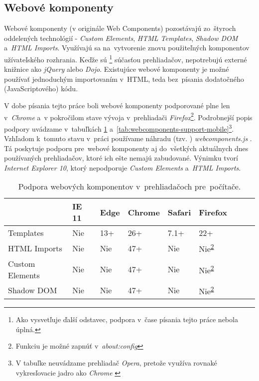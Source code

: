 \subsection{Webové komponenty}

Webové komponenty (v originále Web Components) pozostávajú zo~štyroch oddelených technológií - \emph{Custom Elements}, \emph{HTML Templates}, \emph{Shadow DOM} a~\emph{HTML Imports}. Využívajú sa na~vytvorenie znovu použiteľných komponentov užívateľského rozhrania. Keďže sú \footnote{Ako vysvetľuje ďalší odstavec, podpora v~čase písania tejto práce nebola úplná.} súčasťou prehliadačov, nepotrebujú externé knižnice ako \emph{jQuery} alebo \emph{Dojo}. Existujúce webové komponenty je možné používať jednoduchým importovaním v~HTML, teda bez~písania dodatočného (JavaScriptového) kódu. \cite{MDN_WebComponents}

V dobe písania tejto práce boli webové komponenty podporované plne len v~\emph{Chrome} a~v pokročilom stave vývoja v~prehliadači \emph{Firefox}\footnote{Funkciu je možné zapnúť v~\emph{about:config}\label{aboutconfig}}. Podrobnejší popis podpory uvádzame v~tabuľkách \ref{tab:webcomponents-support-desktop} a~\ref{tab:webcomponents-support-mobile}\footnote{V tabuľke neuvádzame prehliadač \emph{Opera}, pretože využíva rovnaké vykresľovacie jadro ako \emph{Chrome} \cite{Opera_History}}. Vzhľadom k~tomuto stavu v~práci používame náhradu (tzv. ) \emph{webcomponents.js} \cite{Webcomponents_polyfill}. Tá poskytuje podporu pre~webové komponenty aj do~všetkých aktuálnych dnes používaných prehliadačov, ktoré ich ešte nemajú zabudované. Výnimku tvorí \emph{Internet Explorer 10}, ktorý nepodporuje \emph{Custom Elements} a~\emph{HTML Imports}. \cite{Webcomponents_polyfill}


\begin{table}[]
\centering
\begin{tabular}{@{}|l|l|l|l|l|l|l|l|l|@{}}
\toprule
                & IE 11  & Edge & Chrome & Safari & Firefox 								   \\ \midrule
Templates       & Nie    & 13+  & 26+    & 7.1+   & 22+     								   \\ \midrule
HTML Imports    & Nie    & Nie  & 47+    & Nie    & Nie\textsuperscript{\ref{aboutconfig}}    \\ \midrule
Custom Elements & Nie    & Nie  & 47+    & Nie    & Nie\textsuperscript{\ref{aboutconfig}}    \\ \midrule
Shadow DOM      & Nie    & Nie  & 47+    & Nie    & Nie\textsuperscript{\ref{aboutconfig}}    \\ \bottomrule
\end{tabular}
\caption{Podpora webových komponentov v~prehliadačoch pre~počítače. \cite{MDN_Template_Element}\cite{CIU}}
\label{tab:webcomponents-support-desktop}
\end{table}


